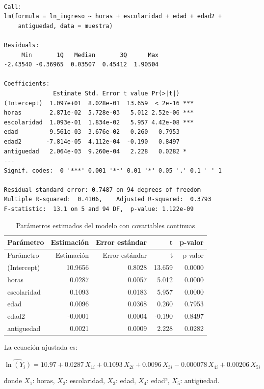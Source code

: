 \documentclass[
  spanish,
  letterpaper,
  DIV=11,
  numbers=noendperiod]{scrartcl}
\begin{document}
\begin{verbatim}

Call:
lm(formula = ln_ingreso ~ horas + escolaridad + edad + edad2 + 
    antiguedad, data = muestra)

Residuals:
     Min       1Q   Median       3Q      Max 
-2.43540 -0.36965  0.03507  0.45412  1.90504 

Coefficients:
              Estimate Std. Error t value Pr(>|t|)    
(Intercept)  1.097e+01  8.028e-01  13.659  < 2e-16 ***
horas        2.871e-02  5.728e-03   5.012 2.52e-06 ***
escolaridad  1.093e-01  1.834e-02   5.957 4.42e-08 ***
edad         9.561e-03  3.676e-02   0.260   0.7953    
edad2       -7.814e-05  4.112e-04  -0.190   0.8497    
antiguedad   2.064e-03  9.260e-04   2.228   0.0282 *  
---
Signif. codes:  0 '***' 0.001 '**' 0.01 '*' 0.05 '.' 0.1 ' ' 1

Residual standard error: 0.7487 on 94 degrees of freedom
Multiple R-squared:  0.4106,    Adjusted R-squared:  0.3793 
F-statistic:  13.1 on 5 and 94 DF,  p-value: 1.122e-09
\end{verbatim}

\begin{longtable}[]{@{}lrrrr@{}}
\caption{Parámetros estimados del modelo con covariables
continuas}\tabularnewline
\toprule\noalign{}
Parámetro & Estimación & Error estándar & t & p-valor \\
\midrule\noalign{}
\endfirsthead
\toprule\noalign{}
Parámetro & Estimación & Error estándar & t & p-valor \\
\midrule\noalign{}
\endhead
\bottomrule\noalign{}
\endlastfoot
(Intercept) & 10.9656 & 0.8028 & 13.659 & 0.0000 \\
horas & 0.0287 & 0.0057 & 5.012 & 0.0000 \\
escolaridad & 0.1093 & 0.0183 & 5.957 & 0.0000 \\
edad & 0.0096 & 0.0368 & 0.260 & 0.7953 \\
edad2 & -0.0001 & 0.0004 & -0.190 & 0.8497 \\
antiguedad & 0.0021 & 0.0009 & 2.228 & 0.0282 \\
\end{longtable}

La ecuación ajustada es:

\[
\widehat{\ln(Y_i)} = 10.97 + 0.0287\,X_{1i} + 0.1093\,X_{2i} + 0.0096\,X_{3i} - 0.000078\,X_{4i} + 0.00206\,X_{5i}
\]

donde \(X_1\): horas, \(X_2\): escolaridad, \(X_3\): edad, \(X_4\):
edad², \(X_5\): antigüedad.
\end{document}
